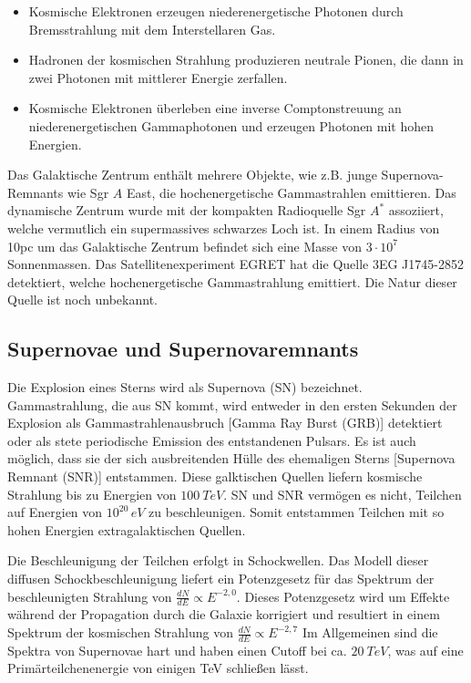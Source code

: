 \begin{itemize}
 \item Kosmische Elektronen erzeugen niederenergetische Photonen durch Bremsstrahlung mit dem Interstellaren Gas.
 \item Hadronen der kosmischen Strahlung produzieren neutrale Pionen, die dann in zwei Photonen mit mittlerer Energie zerfallen.
 \item Kosmische Elektronen überleben eine inverse Comptonstreuung an niederenergetischen Gammaphotonen und erzeugen Photonen mit hohen Energien.
\end{itemize}

Das Galaktische Zentrum enthält mehrere Objekte, wie z.B. junge Supernova-Remnants wie Sgr $A$ East, die hochenergetische Gammastrahlen emittieren.
Das dynamische Zentrum wurde mit der kompakten Radioquelle Sgr $A^*$ assoziiert, welche vermutlich ein supermassives schwarzes Loch ist.
In einem Radius von 10pc um das Galaktische Zentrum befindet sich eine Masse von $3\cdot 10^7$ Sonnenmassen.
Das Satellitenexperiment EGRET hat die Quelle 3EG J1745-2852 detektiert, welche hochenergetische Gammastrahlung emittiert. 
Die Natur dieser Quelle ist noch unbekannt.\cite{GalacticCenter}\cite{Weekes}


\subsection{Supernovae und Supernovaremnants}
Die Explosion eines Sterns wird als Supernova (SN) bezeichnet.
Gammastrahlung, die aus SN kommt, wird entweder in den ersten Sekunden der Explosion als Gammastrahlenausbruch [Gamma Ray Burst (GRB)] detektiert oder als stete periodische Emission des entstandenen Pulsars.
Es ist auch möglich, dass sie der sich ausbreitenden Hülle des ehemaligen Sterns [Supernova Remnant (SNR)] entstammen. 
Diese galktischen Quellen liefern kosmische Strahlung bis zu Energien von $\SI{100}{TeV}$.
SN und SNR vermögen es nicht, Teilchen auf Energien von $10^20\,\si{eV}$ zu beschleunigen.
Somit entstammen Teilchen mit so hohen Energien extragalaktischen Quellen.\cite{Weekes}

Die Beschleunigung der Teilchen erfolgt in Schockwellen.
Das Modell dieser diffusen Schockbeschleunigung liefert ein Potenzgesetz für das Spektrum der beschleunigten Strahlung von $\frac{dN}{dE} \propto E^{-2,0}$.
Dieses Potenzgesetz wird um Effekte während der Propagation durch die Galaxie korrigiert und resultiert in einem Spektrum der kosmischen Strahlung von $\frac{dN}{dE} \propto E^{-2,7}$
Im Allgemeinen sind die Spektra von Supernovae hart und haben einen Cutoff bei ca. $\SI{20}{TeV}$, was auf eine Primärteilchenenergie von einigen TeV schließen lässt.\cite{Weekes}\cite{RhodeFalke}



